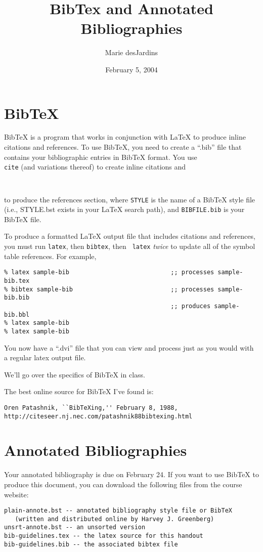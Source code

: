 \documentclass{article}
\title{BibTex and Annotated Bibliographies}
\author{Marie desJardins}
\date{February 5, 2004}
\begin{document}
\maketitle

\section{BibTeX}

BibTeX is a program that works in conjunction with LaTeX to produce
inline citations and references.  To use BibTeX, you need to
create a ``.bib'' file that contains your bibliographic entries in 
BibTeX format.  You use {\tt \\cite} (and variations thereof) to create
inline citations and
\begin{verbatim}


\end{verbatim}
to produce the references section, where {\tt STYLE} is the name of a BibTeX
style file (i.e., STYLE.bst exists in your LaTeX search path), and
{\tt BIBFILE.bib} is your BibTeX file.

To produce a formatted LaTeX output file that includes citations and
references, you must run {\tt latex}, then {\tt bibtex}, then {\tt
  latex} {\em twice} to update all of the symbol table references.
For example,
\begin{verbatim}
% latex sample-bib                            ;; processes sample-bib.tex
% bibtex sample-bib                           ;; processes sample-bib.bib
                                              ;; produces sample-bib.bbl
% latex sample-bib
% latex sample-bib
\end{verbatim}
You now have a ``.dvi'' file that you can view and process just as you
would with a regular latex output file.

We'll go over the specifics of BibTeX in class.

The best online source for BibTeX I've found is:
\begin{verbatim}
Oren Patashnik, ``BibTeXing,'' February 8, 1988,
http://citeseer.nj.nec.com/patashnik88bibtexing.html
\end{verbatim}


\section{Annotated Bibliographies}

Your annotated bibliography is due on February 24.  If you want to use
BibTeX to produce this document, you can download the following files
from the course website:
\begin{verbatim}
plain-annote.bst -- annotated bibliography style file or BibTeX 
   (written and distributed online by Harvey J. Greenberg)
unsrt-annote.bst -- an unsorted version
bib-guidelines.tex -- the latex source for this handout
bib-guidelines.bib -- the associated bibtex file
\end{verbatim}
\end{document}
